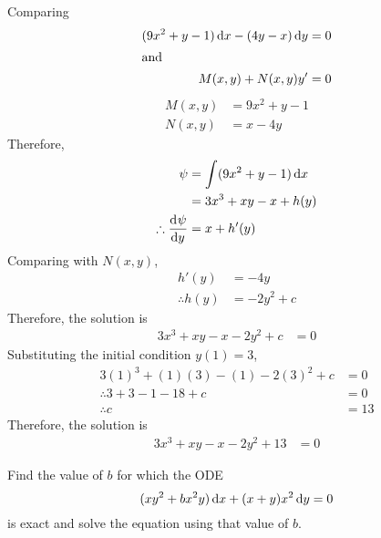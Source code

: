 \documentclass[fleqn, a4paper, 12pt, oneside]{amsart}
\theoremstyle{definition}
\theoremstyle{theorem}
\begin{document}
\begin{solution}
	Comparing
	\begin{align*}
		(9x^2 + y - 1) \dif x - (4y - x) \dif y &= 0\\
		\intertext{and}
		M(x,y) + N(x,y) y' &= 0
	\end{align*}
	\begin{align*}
		M(x,y) &= 9x^2 + y - 1\\
		N(x,y) &= x - 4y
	\end{align*}
	Therefore,
	\begin{align*}
		\psi &= \int (9x^2 + y - 1) \dif x\\
		&= 3x^3 + xy - x + h(y)\\
		\therefore \dod{\psi}{y} &= x + h'(y)
	\end{align*}
	Comparing with $N(x,y)$,
	\begin{align*}
		h'(y) &= -4y\\
		\therefore h(y) &= -2y^2 + c
	\end{align*}
	Therefore, the solution is
	\begin{align*}
		3x^3 + xy - x - 2y^2 + c &= 0
	\end{align*}
	Substituting the initial condition $y(1) = 3$,
	\begin{align*}
		3 (1)^3 + (1)(3) - (1) - 2 (3)^2 + c &= 0\\
		\therefore 3 + 3 - 1 - 18 + c &= 0\\
		\therefore c &= 13
	\end{align*}
	Therefore, the solution is
	\begin{align*}
		3x^3 + xy - x - 2y^2 + 13 &= 0
	\end{align*}
\end{solution}

\begin{question}
	Find the value of $b$ for which the ODE
	\begin{equation*}
		(x y^2 + b x^2 y) \dif x + (x + y) x^2 \dif y = 0
	\end{equation*}
	is exact and solve the equation using that value of $b$.
\end{question}
\end{document}
